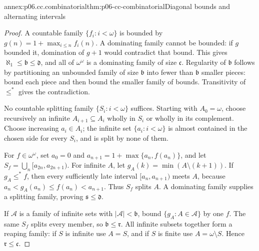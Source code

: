 \begin{annexitem}{annex:p06.cc.combinatorial}{thm:p06-cc-combinatorial}{Diagonal bounds and alternating intervals}
\begin{proof}
A countable family \(\{f_i:i<\omega\}\) is bounded by
\(g(n)=1+\max_{i\leq n}f_i(n)\). A dominating family cannot be bounded:
if \(g\) bounded it, domination of \(g+1\) would contradict that bound.
This gives \(\aleph_1\leq\mathfrak b\leq\mathfrak d\), and all of
\(\omega^\omega\) is a dominating family of size \(\mathfrak c\).
Regularity of \(\mathfrak b\) follows by partitioning an unbounded family
of size \(\mathfrak b\) into fewer than \(\mathfrak b\) smaller pieces:
bound each piece and then bound the smaller family of bounds. Transitivity
of \(\leq^*\) gives the contradiction.

No countable splitting family \(\{S_i:i<\omega\}\) suffices. Starting
with \(A_0=\omega\), choose recursively an infinite
\(A_{i+1}\subseteq A_i\) wholly in \(S_i\) or wholly in its complement.
Choose increasing \(a_i\in A_i\); the infinite set \(\{a_i:i<\omega\}\)
is almost contained in the chosen side for every \(S_i\), and is split
by none of them.

For \(f\in\omega^\omega\), set \(a_0=0\) and
\(a_{n+1}=1+\max\{a_n,f(a_n)\}\), and let
\(S_f=\bigcup_n[a_{2n},a_{2n+1})\). For infinite \(A\), let
\(g_A(k)=\min(A\setminus(k+1))\). If \(g_A\leq^*f\), then every
sufficiently late interval \([a_n,a_{n+1})\) meets \(A\), because
\(a_n<g_A(a_n)\leq f(a_n)<a_{n+1}\). Thus \(S_f\) splits \(A\).
A dominating family supplies a splitting family, proving
\(\mathfrak s\leq\mathfrak d\).

If \(\mathcal A\) is a family of infinite sets with
\(|\mathcal A|<\mathfrak b\), bound \(\{g_A:A\in\mathcal A\}\) by
one \(f\). The same \(S_f\) splits every member, so
\(\mathfrak b\leq\mathfrak r\). All infinite subsets together form
a reaping family: if \(S\) is infinite use \(A=S\), and if \(S\)
is finite use \(A=\omega\setminus S\). Hence
\(\mathfrak r\leq\mathfrak c\).
\end{proof}
\end{annexitem}

